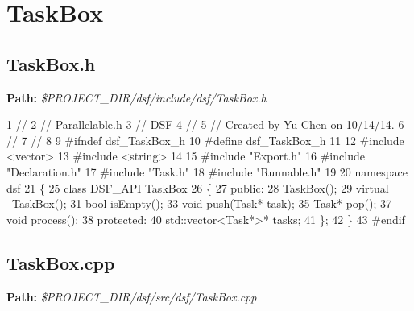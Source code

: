  \hypertarget{_dual_state_framework_DualStateFrameworkTaskBox}{}\section{Task\+Box}\label{_dual_state_framework_DualStateFrameworkTaskBox}
\hypertarget{_dual_state_framework_DualStateFrameworkTaskBox_h}{}\subsection{Task\+Box.\+h}\label{_dual_state_framework_DualStateFrameworkTaskBox_h}
{\bfseries Path\+:} {\itshape \$\+P\+R\+O\+J\+E\+C\+T\+\_\+\+D\+I\+R/dsf/include/dsf/\+Task\+Box.h} 
\begin{DoxyCodeInclude}
1 \textcolor{comment}{//}
2 \textcolor{comment}{//  Parallelable.h}
3 \textcolor{comment}{//  DSF}
4 \textcolor{comment}{//}
5 \textcolor{comment}{//  Created by Yu Chen on 10/14/14.}
6 \textcolor{comment}{//}
7 \textcolor{comment}{//}
8 
9 \textcolor{preprocessor}{#ifndef dsf\_TaskBox\_h}
10 \textcolor{preprocessor}{#define dsf\_TaskBox\_h}
11 
12 \textcolor{preprocessor}{#include <vector>}
13 \textcolor{preprocessor}{#include <string>}
14 
15 \textcolor{preprocessor}{#include "Export.h"}
16 \textcolor{preprocessor}{#include "Declaration.h"}
17 \textcolor{preprocessor}{#include "Task.h"}
18 \textcolor{preprocessor}{#include "Runnable.h"}
19 
20 \textcolor{keyword}{namespace }dsf
21 \{
25     \textcolor{keyword}{class }DSF\_API TaskBox
26     \{
27     \textcolor{keyword}{public}:
28         TaskBox();
29         \textcolor{keyword}{virtual} ~TaskBox();
31         \textcolor{keywordtype}{bool} isEmpty();
33         \textcolor{keywordtype}{void} push(Task* task);
35         Task* pop();
37         \textcolor{keywordtype}{void} process();
38     \textcolor{keyword}{protected}:
40         std::vector<Task*>* tasks;
41     \};
42 \}
43 \textcolor{preprocessor}{#endif}
\end{DoxyCodeInclude}
 \hypertarget{_dual_state_framework_DualStateFrameworkTaskBox_cpp}{}\subsection{Task\+Box.\+cpp}\label{_dual_state_framework_DualStateFrameworkTaskBox_cpp}
{\bfseries Path\+:} {\itshape \$\+P\+R\+O\+J\+E\+C\+T\+\_\+\+D\+I\+R/dsf/src/dsf/\+Task\+Box.cpp} 

